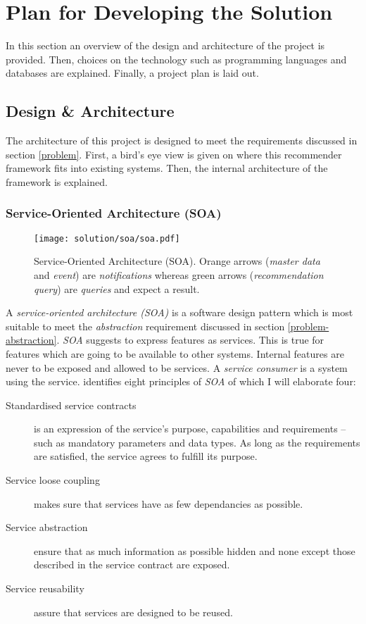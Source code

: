\chapter{Plan for Developing the Solution}

In this section an overview of the design and architecture of the project is provided. Then, choices on the technology such as programming languages and databases are explained. Finally, a project plan is laid out.



\section{Design \& Architecture}

The architecture of this project is designed to meet the requirements discussed in section \ref{problem}. First, a bird's eye view is given on where this recommender framework fits into existing systems. Then, the internal architecture of the framework is explained.

\subsection{Service-Oriented Architecture (SOA)}
\label{sol-design-soa}

\begin{figure}[ht]
    \texttt{[image: solution/soa/soa.pdf]}
    \caption[Service-Oriented Architecture (SOA)]{Service-Oriented Architecture (SOA). Orange arrows (\emph{master data} and \emph{event}) are \emph{notifications} whereas green arrows (\emph{recommendation query}) are \emph{queries} and expect a result.}
    \label{fig:soa}
\end{figure}

A \emph{service-oriented architecture (SOA)} is a software design pattern which is most suitable to meet the \emph{abstraction} requirement discussed in section \ref{problem-abstraction}. \emph{SOA} suggests to express features as services. This is true for features which are going to be available to other systems. Internal features are never to be exposed and allowed to be services. A \emph{service consumer} is a system using the service. \cite{erl08} identifies eight principles of \emph{SOA} of which I will elaborate four:

\begin{description}
    \item[Standardised service contracts] is an expression of the service's purpose, capabilities and requirements -- such as mandatory parameters and data types. As long as the requirements are satisfied, the service agrees to fulfill its purpose.
    \item[Service loose coupling] makes sure that services have as few dependancies as possible.
    \item[Service abstraction] ensure that as much information as possible hidden and none except those described in the service contract are exposed.
    \item[Service reusability] assure that services are designed to be reused.
\end{description}

